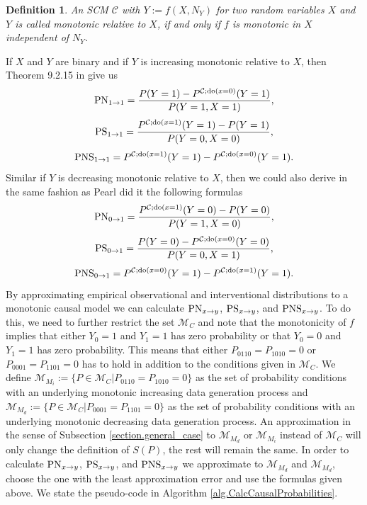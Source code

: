 \documentclass[letterpaper]{article}
\newcommand{\kC}{\mathcal{C}}   %
\newcommand{\kM}{\mathcal{M}}   %
\newtheorem{Def}{Definition}
\newcommand{\DO}{{\rm do}}
\newcommand{\PN}{{\rm PN}}
\newcommand{\PS}{{\rm PS}}
\newcommand{\PNS}{{\rm PNS}}
\begin{document}
\begin{Def}
An SCM $\kC$ with $Y:= f(X, N_Y)$ for two random variables $X$ and $Y$ is called {\em monotonic} relative to $X$, if and only if $f$ is monotonic in $X$ independent of $N_Y$.
\end{Def}

If $X$ and $Y$ are binary and if $Y$ is increasing monotonic relative to $X$, then Theorem 9.2.15 in \cite{Pea09} give us
\begin{equation} \label{eq.PN_incr}
\PN_{1\rightarrow 1} = \frac{P(Y=1) - P^{\kC; \DO(x=0)}(Y=1)}{P(Y=1, X=1)},
\end{equation}
\begin{equation} \label{eq.PS_incr}
\PS_{1\rightarrow 1} = \frac{P^{\kC; \DO(x=1)}(Y=1) - P(Y=1)}{P(Y=0,X=0)},
\end{equation}
\begin{equation} \label{eq.PNS_incr}
\PNS_{1\rightarrow 1} = P^{\kC; \DO(x=1)}(Y=1) - P^{\kC; \DO(x=0)}(Y=1).
\end{equation}
Similar if $Y$ is decreasing monotonic relative to $X$, then we could also derive in the same fashion as Pearl did it the following formulas
\begin{equation} \label{eq.PN_decr}
\PN_{0\rightarrow 1} = \frac{P^{\kC; \DO(x=1)}(Y=0)- P(Y=0)}{P(Y=1, X=0)},
\end{equation}
\begin{equation} \label{eq.PS_decr}
\PS_{0\rightarrow 1} = \frac{P(Y=0)-P^{\kC; \DO(x=0)}(Y=0)}{P(Y=0,X=1)},
\end{equation}
\begin{equation}\label{eq.PNS_decr}
\PNS_{0\rightarrow 1} = P^{\kC; \DO(x=0)}(Y=1) - P^{\kC; \DO(x=1)}(Y=1).
\end{equation}
By approximating empirical observational and interventional distributions to a monotonic causal model we can calculate $\PN_{x\rightarrow y}$, $\PS_{x\rightarrow y}$, and $\PNS_{x\rightarrow y}$. To do this, we need to further restrict the set $\kM_C$ and note that the monotonicity of $f$ implies that either $Y_0=1$ and $Y_1=1$ has zero probability or that $Y_0=0$ and $Y_1=1$ has zero probability. This means that either $P_{0110} = P_{1010} = 0$ or $P_{0001} = P_{1101}=0$ has to hold in addition to the conditions given in $\kM_C$. We define $\kM_{M_i} := \{P \in \kM_C | P_{0110} = P_{1010} = 0\}$ as the set of probability conditions with an underlying monotonic increasing data generation process and $\kM_{M_d} := \{P \in \kM_C | P_{0001} = P_{1101} = 0\}$ as the set of probability conditions with an underlying monotonic decreasing data generation process.
An approximation in the sense of Subsection \ref{section.general_case} to $\kM_{M_d}$ or $\kM_{M_i}$ instead of $\kM_C$ will only change the definition of $S(P)$, the rest will remain the same. In order to calculate $\PN_{x\rightarrow y}$, $\PS_{x\rightarrow y}$, and $\PNS_{x\rightarrow y}$ we approximate to $\kM_{M_d}$ and $\kM_{M_d}$, choose the one with the least approximation error and use the formulas given above. We state the pseudo-code in Algorithm \ref{alg.CalcCausalProbabilities}.
\end{document}
